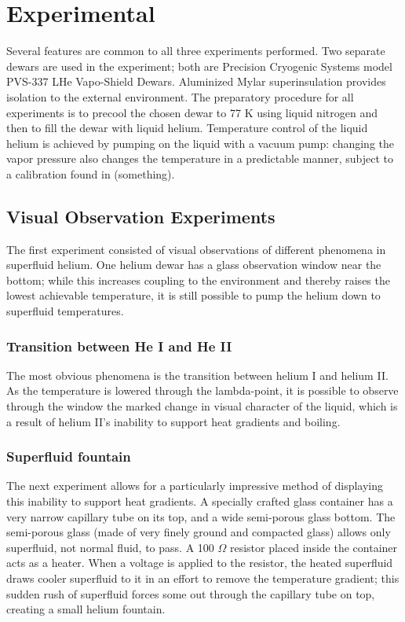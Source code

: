 
\section{Experimental}\label{experimental}

Several features are common to all three experiments performed. Two separate dewars are used in the experiment; both are Precision Cryogenic Systems model PVS-337 LHe Vapo-Shield Dewars. Aluminized Mylar superinsulation provides isolation to the external environment. The preparatory procedure for all experiments is to precool the chosen dewar to 77 K using liquid nitrogen and then to fill the dewar with liquid helium. Temperature control of the liquid helium is achieved by pumping on the liquid with a vacuum pump: changing the vapor pressure also changes the temperature in a predictable manner, subject to a calibration found in (something).


\subsection{Visual Observation Experiments}

The first experiment consisted of visual observations of different phenomena in superfluid helium. One helium dewar has a glass observation window near the bottom; while this increases coupling to the environment and thereby raises the lowest achievable temperature, it is still possible to pump the helium down to superfluid temperatures.

\subsubsection{Transition between He I and He II}

The most obvious phenomena is the transition between helium I and helium II. As the temperature is lowered through the lambda-point, it is possible to observe through the window the marked change in visual character of the liquid, which is a result of helium II's inability to support heat gradients and boiling.

\subsubsection{Superfluid fountain}

The next experiment allows for a particularly impressive method of displaying this inability to support heat gradients. A specially crafted glass container has a very narrow capillary tube on its top, and a wide semi-porous glass bottom. The semi-porous glass (made of very finely ground and compacted glass) allows only superfluid, not normal fluid, to pass. A 100 $\Omega$ resistor placed inside the container acts as a heater. When a voltage is applied to the resistor, the heated superfluid draws cooler superfluid to it in an effort to remove the temperature gradient; this sudden rush of superfluid forces some out through the capillary tube on top, creating a small helium fountain.

